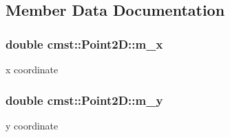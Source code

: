 \subsection{Member Data Documentation}
\subsubsection[{\texorpdfstring{m\+\_\+x}{m_x}}]{\setlength{\rightskip}{0pt plus 5cm}double cmst\+::\+Point2\+D\+::m\+\_\+x\hspace{0.3cm}{\ttfamily [private]}}\hypertarget{classcmst_1_1_point2_d_ae531b08a2a67babee5b677b4b7e79ea9}{}\label{classcmst_1_1_point2_d_ae531b08a2a67babee5b677b4b7e79ea9}


x coordinate 

\subsubsection[{\texorpdfstring{m\+\_\+y}{m_y}}]{\setlength{\rightskip}{0pt plus 5cm}double cmst\+::\+Point2\+D\+::m\+\_\+y\hspace{0.3cm}{\ttfamily [private]}}\hypertarget{classcmst_1_1_point2_d_a24414f1e4970aa89c3d7137a9e7955a5}{}\label{classcmst_1_1_point2_d_a24414f1e4970aa89c3d7137a9e7955a5}


y coordinate 

